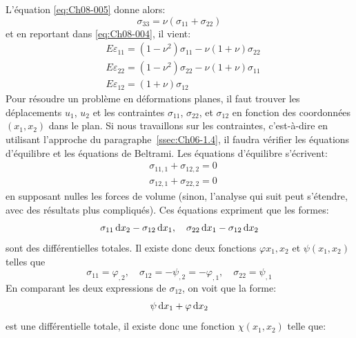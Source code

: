 L'équation \eqref{eq:Ch08-005} donne alors:
\begin{equation}
    \sigma_{33}=\nu(\sigma_{11}+\sigma_{22})
    \label{eq:Ch08-006}
\end{equation}
et en reportant dans \eqref{eq:Ch08-004}, il vient: 
\begin{equation}
   \begin{aligned}
    & E\varepsilon_{11} = (1-\nu^2)\sigma_{11} - \nu(1+\nu)\sigma_{22}\\
    & E\varepsilon_{22} = (1-\nu^2)\sigma_{22} - \nu(1+\nu)\sigma_{11}\\
    & E\varepsilon_{12} = (1+\nu)\sigma_{12}
   \end{aligned}
    \label{eq:Ch08-007}
\end{equation}
Pour résoudre un problème en déformations planes, il faut trouver les déplacements $u_1$, $u_2$ et les contraintes $\sigma_{11}$, $\sigma_{22}$, et $\sigma_{12}$ en fonction des coordonnées $(x_1,x_2)$ dans le plan.
Si nous travaillons sur les contraintes, c'est-à-dire en utilisant l'approche du paragraphe~\ref{ssec:Ch06-1.4}, il faudra vérifier les équations d'équilibre et les équations de Beltrami. 
Les équations d'équilibre s'écrivent: 
\begin{equation}
   \begin{aligned}
     &\sigma_{11,1}+\sigma_{12,2}=0\\
     &\sigma_{12,1}+\sigma_{22,2}=0
   \end{aligned}
    \label{eq:Ch08-008}
\end{equation}
en supposant nulles les forces de volume (sinon, l'analyse qui suit peut s'étendre, avec des résultats plus compliqués). 
Ces équations expriment que les formes: 
\begin{equation*}
\sigma_{11}\mathop{\mathrm{{}d}}\mathopen{} x_2-\sigma_{12}\mathop{\mathrm{{}d}}\mathopen{} x_1,\quad \sigma_{22}\mathop{\mathrm{{}d}}\mathopen{} x_1-\sigma_{12}\mathop{\mathrm{{}d}}\mathopen{} x_2
\end{equation*}
sont des différentielles totales. Il existe donc deux fonctions $\varphi{x_1,x_2}$ et $\psi(x_1,x_2)$ telles que 
\begin{equation*}
\sigma_{11}=\varphi_{,2},\quad \sigma_{12}=-\psi_{,2}=-\varphi_{,1},\quad \sigma_{22}=\psi_{,1}
\end{equation*}
En comparant les deux expressions de $\sigma_{12}$, on voit que la forme: 
\begin{equation*}
\psi \mathop{\mathrm{{}d}}\mathopen{} x_1 + \varphi \mathop{\mathrm{{}d}}\mathopen{} x_2
\end{equation*}
est une différentielle totale, il existe donc une fonction $\chi(x_1,x_2)$ telle que: 
